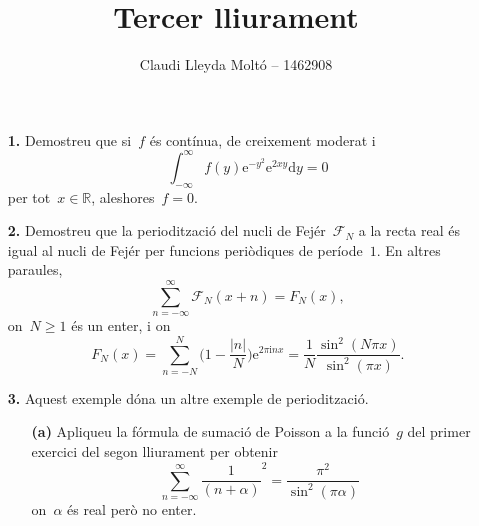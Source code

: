 \documentclass[a4paper]{article}
\title{Tercer lliurament}
\author{Claudi Lleyda Moltó -- 1462908}
\theoremstyle{definition}
\newcommand{\iu}{\mathrm{i}}
\newcommand{\e}{\mathrm{e}}
\providecommand{\uppi}{\pi}
\newcommand{\diff}{\mathrm{d}}
\newcommand{\abs}[1]{\lvert{#1}\rvert}
\newcommand{\F}{\mathcal{F}}
\begin{document}
\maketitle

\begin{enumerate}
    \item[\textbf{1.}] Demostreu que si~\(f\) és contínua, de creixement moderat
        i
        \[
            \int_{-\infty}^{\infty}f(y)\e^{-y^{2}}\e^{2xy}\diff y=0
        \]
        per tot~\(x\in\mathbb{R}\), aleshores~\(f=0\).
\end{enumerate}

\begin{enumerate}
    \item[\textbf{2.}] Demostreu que la periodització del nucli de
        Fejér~\(\F_{N}\) a la recta real és igual al nucli de Fejér per funcions
        periòdiques de període~\(1\).
        En altres paraules,
        \[
            \sum_{n=-\infty}^{\infty} \F_{N}(x+n)
            = F_{N}(x),
        \]
        on~\(N\geq1\) és un enter, i on
        \[
            F_{N}(x) = \sum_{n=-N}^{N} \biggl(1 - \frac{\abs{n}}{N}\biggr)
            \e^{2\uppi\iu nx}
            = \frac{1}{N}\frac{\sin^{2}(N\uppi x)}{\sin^{2}(\uppi x)}.
        \]
\end{enumerate}

\begin{enumerate}
    \item[\textbf{3.}] Aquest exemple dóna un altre exemple de periodització.
        \begin{enumerate}
            \item[\textbf{(a)}] Apliqueu la fórmula de sumació de Poisson a la
                funció~\(g\) del primer exercici del segon lliurament per
                obtenir
                \[
                    \sum_{n=-\infty}^{\infty} \frac{1}{(n+\alpha)}^{2}
                    = \frac{\uppi^{2}}{\sin^{2}(\uppi\alpha)}
                \]
                on~\(\alpha\) és real però no enter.
        \end{enumerate}
\end{enumerate}
\end{document}
